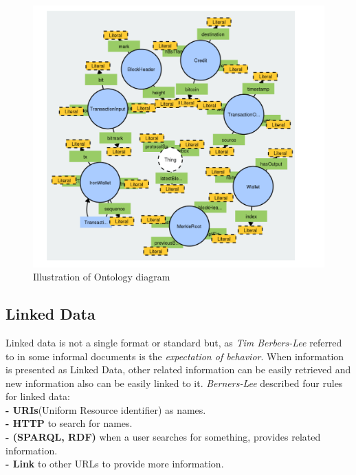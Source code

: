 \begin{center}
	
	
	\begin{figure}[htb!]
		
		\begin{minipage}{0.55\linewidth}
			\centering
			\includegraphics[width=1.65\textwidth]{images/chap02_diagram_ontology.png}
		\end{minipage}
		\caption[Illustration of Ontology diagram]{Illustration of Ontology diagram\cite{Matthew}}
		
		
	\end{figure}
	
\end{center}

\subsection{Linked Data}
Linked data is not a single format or standard but, as \textit{Tim Berbers-Lee} referred to in some informal documents is the \textit{expectation of behavior}. When information
is presented as Linked Data, other related information can be easily retrieved and new information also can be easily linked to it. \textit{Berners-Lee} described four rules for linked data:\\
\textbf{- URIs}(Uniform Resource identifier) as names.\\ 
\textbf{- HTTP} to search for names.\\
\textbf{- (SPARQL, RDF)}  when a user searches for something, provides related information.\\
\textbf{- Link} to other URLs to provide more information\cite{Hector}.\\

